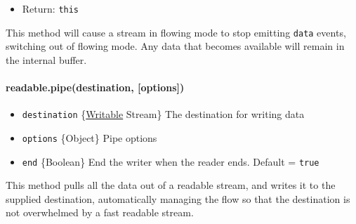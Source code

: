 \begin{itemize}
\item
  Return: \texttt{this}
\end{itemize}

This method will cause a stream in flowing mode to stop emitting
\texttt{data} events, switching out of flowing mode. Any data that
becomes available will remain in the internal buffer.

\begin{Shaded}
\end{Shaded}

\paragraph{readable.pipe(destination, {[}options{]})}

\begin{itemize}
\item
  \texttt{destination}
  \{\hyperref[stream\_class\_stream\_writable]{Writable} Stream\} The
  destination for writing data
\item
  \texttt{options} \{Object\} Pipe options
\item
  \texttt{end} \{Boolean\} End the writer when the reader ends. Default
  = \texttt{true}
\end{itemize}

This method pulls all the data out of a readable stream, and writes it
to the supplied destination, automatically managing the flow so that the
destination is not overwhelmed by a fast readable stream.

